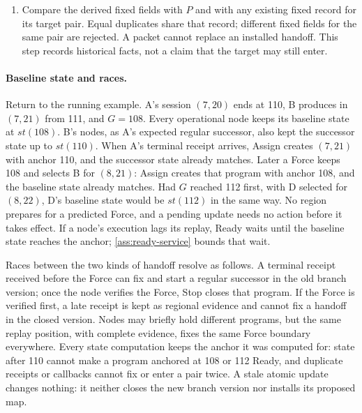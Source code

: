 \documentclass[11pt,a4paper]{article}
\begin{document}
\begin{enumerate}[label=(\roman*),itemsep=2pt]
$S_{\beta_m}$ and set
$q^{\rm open}_{\beta',r'}=\max\{\operatorname{height}(\xi(T_{\beta_m,r_m})),
q^{\rm open}_{\beta_m,r_m}+1\}$. For MSIG, use the executing update's
complete $S_{\rm new}$ and set $q^{\rm open}_{\beta',r'}=q(\theta_a)$.
Check the target region and immutable target authority, and set
$\lambda^{\rm open}_{\beta',r'}$ to the maximum of the anchor's L1
reference height and the initial authority's publication height. Validate
the anchor's original direct or
covering commitment evidence under \cref{sec:coverage,sec:receipt-kernel},
together with its complete block and required ancestry. Do not relabel
it with the target pair.
\item Compare the derived fixed fields with $P$ and with any existing
fixed record for its target pair. Equal duplicates share that record;
different fixed fields for the same pair are rejected. A packet cannot
replace an installed handoff. This step records historical facts, not a
claim that the target may still enter.
\end{enumerate}


\paragraph{Baseline state and races.}
\label{sec:runtime-races}
Return to the running example. A's session $(7,20)$ ends at 110, B
produces in $(7,21)$ from 111, and $G=108$. Every operational node keeps
its baseline state at $\mathit{st}(108)$. B's nodes, as A's expected
regular successor, also kept the successor state up to $\mathit{st}(110)$.
When A's terminal receipt arrives, Assign creates $(7,21)$ with anchor 110,
and the successor state already matches. Later a Force keeps 108 and
selects B for $(8,21)$: Assign creates that program with anchor 108, and
the baseline state already matches. Had $G$ reached 112 first, with D
selected for $(8,22)$, D's baseline state would be $\mathit{st}(112)$ in
the same way. No
region prepares for a predicted Force, and a pending update needs no
action before it takes effect. If a node's execution lags its replay,
Ready waits until the baseline state reaches the anchor; \cref{ass:ready-service}
bounds that wait.

Races between the two kinds of handoff resolve as follows. A terminal
receipt received before the Force can fix and start a regular successor
in the old branch version; once the node verifies the Force, Stop closes
that program. If the Force is verified first, a late receipt is kept as
regional evidence and cannot fix a handoff in the closed version. Nodes
may briefly hold different programs, but the same replay position, with
complete evidence, fixes the same Force boundary everywhere. Every state
computation keeps the anchor it was computed for: state after 110
cannot make a program anchored at 108 or 112 Ready, and duplicate
receipts or callbacks cannot fix or enter a pair twice. A stale atomic
update changes nothing: it neither closes the new branch version nor
installs its proposed map.
\end{document}

